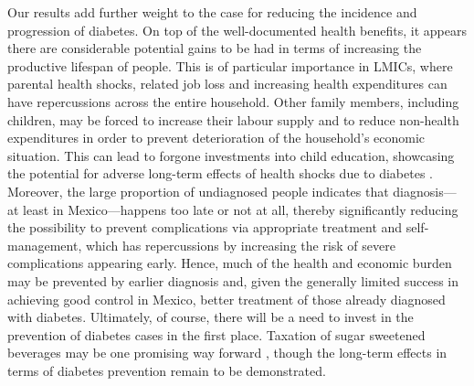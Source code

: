 Our results add further weight to the case for reducing the incidence and progression of diabetes. On top of the well-documented health benefits, it appears there are considerable potential gains to be had in terms of increasing the productive lifespan of people. This is of particular importance in \acp{LMIC}, where parental health shocks, related job loss and increasing health expenditures can have repercussions across the entire household. Other family members, including children, may be forced to increase their labour supply and to reduce non-health expenditures in order to prevent deterioration of the household's economic situation. This can lead to forgone investments into child education, showcasing the potential for adverse long-term effects of health shocks due to diabetes \parencite{Bratti2014}. Moreover, the large proportion of undiagnosed people indicates that diagnosis---at least in Mexico---happens too late or not at all, thereby significantly reducing the possibility to prevent complications via appropriate treatment and self-management, which has repercussions by increasing the risk of severe complications appearing early. Hence, much of the health and economic burden may be prevented by earlier diagnosis and, given the generally limited success in achieving good control in Mexico, better treatment of those already diagnosed with diabetes. Ultimately, of course, there will be a need to invest in the prevention of diabetes cases in the first place. Taxation of sugar sweetened beverages may be one promising way forward \parencite{Colchero2016}, though the long-term effects in terms of diabetes prevention remain to be demonstrated.







